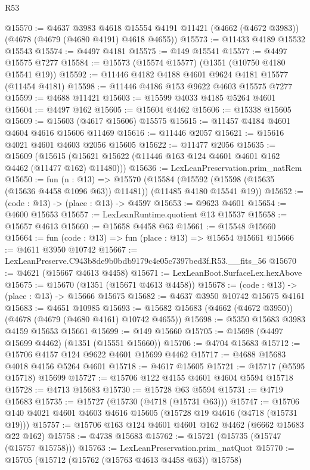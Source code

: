 \begin{lexlean}{R53}
\begin{coremodule}
@15570 := @4637
    @3983
    @4618
    @15554
    @4191
    @11421
    (@4662 (@4672 @3983))
    (@4678 (@4679 (@4680 @4191) @4618 @4655))
@15573 := @11433 @4189 @15532 @15543
@15574 := @4497 @4181
@15575 := @149 @15541
@15577 := @4497 @15575 @7277
@15584 := @15573 (@15574 @15577) (@1351 (@10750 @4180 @15541 @19))
@15592 := @11446 @4182 @4188 @4601 @9624 @4181 @15577 (@11454 @4181)
@15598 := @11446 @4186 @153 @9622 @4603 @15575 @7277
@15599 := @4688 @11421
@15603 := @15599 @4033 @4185 @5264 @4601
@15604 := @4497 @162
@15605 := @15604 @4462
@15606 := @15338 @15605
@15609 := @15603 (@4617 @15606) @15575
@15615 := @11457 @4184 @4601 @4604 @4616 @15606 @11469
@15616 := @11446 @2057
@15621 := @15616 @4021 @4601 @4603 @2056 @15605
@15622 := @11477 @2056
@15635 := @15609
    (@15615 (@15621 @15622 (@11446 @163 @124 @4601 @4601 @162 @4462 (@11477 @162) @11480)))
@15636 := LexLeanPreservation.prim_natRem
@15650 := fun (n : @13) =>
  @15570
    (@15584 (@15592 (@15598 (@15635 (@15636 @4458 @1096 @63)) @11481)) (@11485 @4180 @15541 @19))
@15652 := (code : @13) -> (place : @13) -> @4597
@15653 := @9623 @4601
@15654 := @4600 @15653
@15657 := LexLeanRuntime.quotient @13 @15537
@15658 := @15657 @4613
@15660 := @15658 @4458 @63
@15661 := @15548 @15660
@15664 := fun (code : @13) => fun (place : @13) => @15654 @15661
@15666 := @4611 @3950 @10742
@15667 := LexLeanPreserve.C943b8de9b0bdb9179c4e05c7397bed3f.R53.__fits_56
@15670 := @4621 (@15667 @4613 @4458)
@15671 := LexLeanBoot.SurfaceLex.hexAbove
@15675 := @15670 (@1351 (@15671 @4613 @4458))
@15678 := (code : @13) -> (place : @13) -> @15666 @15675
@15682 := @4637 @3950 @10742 @15675 @4161
@15683 := @4651 @10985
@15693 := @15682 @15683 (@4662 (@4672 @3950)) (@4678 (@4679 (@4680 @4161) @10742 @4655))
@15698 := @5350 @15683 @3983 @4159 @15653 @15661
@15699 := @149 @15660
@15705 := @15698 (@4497 @15699 @4462) (@1351 (@15551 @15660))
@15706 := @4704 @15683
@15712 := @15706 @4157 @124 @9622 @4601 @15699 @4462
@15717 := @4688 @15683 @4018 @4156 @5264 @4601
@15718 := @4617 @15605
@15721 := @15717 (@5595 @15718) @15699
@15727 := @15706 @122 @4155 @4601 @4604 @5594 @15718
@15728 := @4713 @15683
@15730 := @15728 @63 @5594
@15731 := @4719 @15683
@15735 := @15727 (@15730 (@4718 (@15731 @63)))
@15747 := @15706 @140 @4021 @4601 @4603 @4616 @15605 (@15728 @19 @4616 (@4718 (@15731 @19)))
@15757 := @15706 @163 @124 @4601 @4601 @162 @4462 (@6662 @15683 @22 @162)
@15758 := @4738 @15683
@15762 := @15721 (@15735 (@15747 (@15757 @15758)))
@15763 := LexLeanPreservation.prim_natQuot
@15770 := @15705 (@15712 (@15762 (@15763 @4613 @4458 @63)) @15758)

\end{coremodule}
\end{lexlean}
